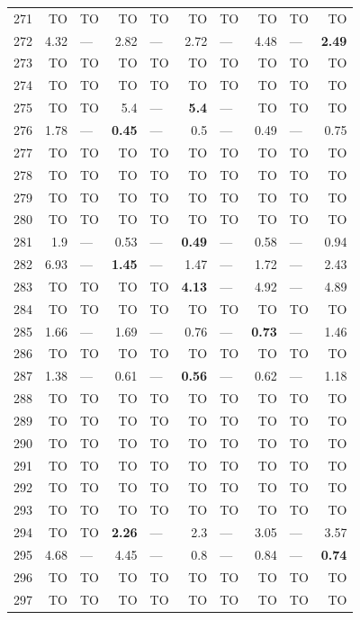 \begin{longtable}{lr@{\hskip 4pt}l@{\hskip 12pt}r@{\hskip 4pt}l@{\hskip 12pt}r@{\hskip 4pt}l@{\hskip 12pt}r@{\hskip 4pt}l@{\hskip 12pt}r}
271 & TO & TO & TO & TO & TO & TO & TO & TO & TO \\
272 & 4.32 & --- & 2.82 & --- & 2.72 & --- & 4.48 & --- & \textbf{2.49} \\
273 & TO & TO & TO & TO & TO & TO & TO & TO & TO \\
274 & TO & TO & TO & TO & TO & TO & TO & TO & TO \\
275 & TO & TO & 5.4 & --- & \textbf{5.4} & --- & TO & TO & TO \\
276 & 1.78 & --- & \textbf{0.45} & --- & 0.5 & --- & 0.49 & --- & 0.75 \\
277 & TO & TO & TO & TO & TO & TO & TO & TO & TO \\
278 & TO & TO & TO & TO & TO & TO & TO & TO & TO \\
279 & TO & TO & TO & TO & TO & TO & TO & TO & TO \\
280 & TO & TO & TO & TO & TO & TO & TO & TO & TO \\
281 & 1.9 & --- & 0.53 & --- & \textbf{0.49} & --- & 0.58 & --- & 0.94 \\
282 & 6.93 & --- & \textbf{1.45} & --- & 1.47 & --- & 1.72 & --- & 2.43 \\
283 & TO & TO & TO & TO & \textbf{4.13} & --- & 4.92 & --- & 4.89 \\
284 & TO & TO & TO & TO & TO & TO & TO & TO & TO \\
285 & 1.66 & --- & 1.69 & --- & 0.76 & --- & \textbf{0.73} & --- & 1.46 \\
286 & TO & TO & TO & TO & TO & TO & TO & TO & TO \\
287 & 1.38 & --- & 0.61 & --- & \textbf{0.56} & --- & 0.62 & --- & 1.18 \\
288 & TO & TO & TO & TO & TO & TO & TO & TO & TO \\
289 & TO & TO & TO & TO & TO & TO & TO & TO & TO \\
290 & TO & TO & TO & TO & TO & TO & TO & TO & TO \\
291 & TO & TO & TO & TO & TO & TO & TO & TO & TO \\
292 & TO & TO & TO & TO & TO & TO & TO & TO & TO \\
293 & TO & TO & TO & TO & TO & TO & TO & TO & TO \\
294 & TO & TO & \textbf{2.26} & --- & 2.3 & --- & 3.05 & --- & 3.57 \\
295 & 4.68 & --- & 4.45 & --- & 0.8 & --- & 0.84 & --- & \textbf{0.74} \\
296 & TO & TO & TO & TO & TO & TO & TO & TO & TO \\
297 & TO & TO & TO & TO & TO & TO & TO & TO & TO \\

\end{longtable}

